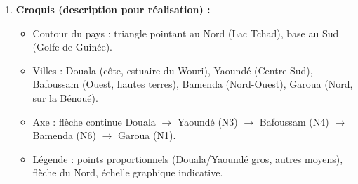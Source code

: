 \documentclass[11pt]{article}
\begin{document}
\begin{exoresolu}
\begin{enumerate}
\begin{itemize}
        \item \textbf{Infrastructures :} aéroports internationaux, nœuds routiers et ferroviaires (Transcamerounais), universités, grands hôpitaux.
        \item \textbf{Effet d'entraînement :} attraction des migrants (exode rural), concentration des investissements publics et privés $\rightarrow$ cercle cumulatif de la concentration.
    \end{itemize}
    \item \textbf{Croquis (description pour réalisation) :}
    \begin{itemize}
        \item Contour du pays : triangle pointant au Nord (Lac Tchad), base au Sud (Golfe de Guinée).
        \item Villes : Douala (côte, estuaire du Wouri), Yaoundé (Centre-Sud), Bafoussam (Ouest, hautes terres), Bamenda (Nord-Ouest), Garoua (Nord, sur la Bénoué).
        \item Axe : flèche continue Douala $\rightarrow$ Yaoundé (N3) $\rightarrow$ Bafoussam (N4) $\rightarrow$ Bamenda (N6) $\rightarrow$ Garoua (N1).
        \item Légende : points proportionnels (Douala/Yaoundé gros, autres moyens), flèche du Nord, échelle graphique indicative.
    \end{itemize}
\end{enumerate}
\end{exoresolu}
\end{document}
